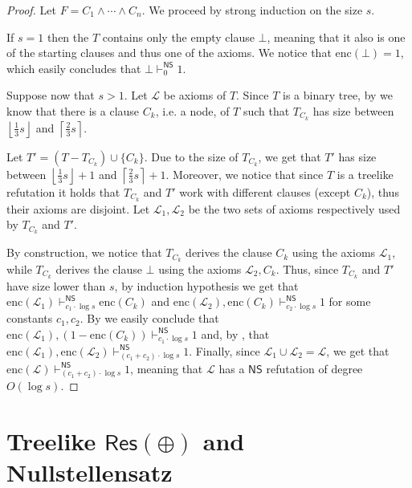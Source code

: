 \documentclass[12pt]{article}
\theoremstyle{definition}
\newcommand{\ResP}{\mathsf{Res(\oplus)}}
\newcommand{\NS}{\mathsf{NS}}
\newcommand{\enc}{\mathrm{enc}}
\newcommand{\floor}[1]{\left \lfloor #1 \right \rfloor}
\newcommand{\ceil}[1]{\left \lceil #1 \right \rceil}
\begin{document}
    \begin{proof}
        Let $F = C_1 \land \cdots \land C_n$. We proceed by strong induction on the size $s$.
        
        If $s = 1$ then the $T$ contains only the empty clause $\bot$, meaning that it also is one of the starting clauses and thus one of the axioms. We notice that $\mathrm{enc}(\bot) = 1$, which easily concludes that $\bot \vdash_{0}^\NS 1$.

        Suppose now that $s > 1$. Let $\mathcal{L}$ be axioms of $T$. Since $T$ is a binary tree, by  we know that there is a clause $C_k$, i.e. a node, of $T$ such that $T_{C_k}$ has size between $\floor{\frac{1}{3} s}$ and $\ceil{\frac{2}{3} s}$.

        Let $T' = (T - T_{C_k}) \cup \{C_k\}$. Due to the size of $T_{C_k}$, we get that $T'$ has size between $\floor{\frac{1}{3} s}+1$ and $\ceil{\frac{2}{3} s}+1$. Moreover, we notice that since $T$ is a treelike refutation it holds that $T_{C_k}$ and $T'$ work with different clauses (except $C_k$), thus their axioms are disjoint. Let $\mathcal{L}_1, \mathcal{L}_2$ be the two sets of axioms respectively used by $T_{C_k}$ and $T'$.
        
        By construction, we notice that $T_{C_k}$ derives the clause $C_k$ using the axioms $\mathcal{L}_1$, while $T_{C_k}$ derives the clause $\bot$ using the axioms $\mathcal{L}_2, C_k$. Thus, since $T_{C_k}$ and $T'$ have size lower than $s$, by induction hypothesis we get that $\enc(\mathcal{L}_1) \vdash_{c_1 \cdot \log s}^\NS \enc(C_k)$ and $\enc(\mathcal{L}_2), \enc(C_k) \vdash_{c_2 \cdot \log s}^\NS 1$ for some constants $c_1, c_2$. By  we easily conclude that $\enc(\mathcal{L}_1), (1- \enc(C_k)) \vdash_{c_1 \cdot \log s}^\NS 1$ and, by , that $\enc(\mathcal{L}_1), \enc(\mathcal{L}_2) \vdash_{(c_1+c_2) \cdot \log s}^\NS 1$. Finally, since $\mathcal{L}_1 \cup \mathcal{L}_2 = \mathcal{L}$, we get that $\enc(\mathcal{L}) \vdash_{(c_1+c_2) \cdot \log s}^\NS 1$, meaning that $\mathcal{L}$ has a $\NS$ refutation of degree $O(\log s)$.

    \end{proof}
    
    \newpage

    \section{Treelike $\ResP$ and Nullstellensatz}
\end{document}
